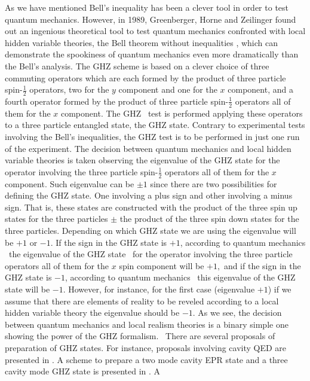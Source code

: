 \documentclass[12pt,thmsa]{article}
\begin{document}
As we have mentioned Bell's inequality has been a clever tool in order to
test quantum mechanics. However, in 1989, Greenberger, Horne and Zeilinger
found out an ingenious theoretical tool to test quantum mechanics confronted
with local hidden variable theories, the Bell theorem without inequalities 
\cite{GHZ, Mermin, RevBellsIneq}, which can demonstrate the spookiness of
quantum mechanics even more dramatically than the Bell's analysis. The GHZ
scheme is based on a clever choice of three commuting operators which are
each formed by the product of three particle spin-$\frac{1}{2}$ operators,
two for the $y$ component and one for the $x$ component, and a fourth
operator formed by the product of three particle spin-$\frac{1}{2}$
operators all of them for the $x$ component. The GHZ \ test is performed
applying these operators to a three particle entangled state, the GHZ state.
Contrary to experimental tests involving the Bell's inequalities, the GHZ
test is to be performed in just one run of the experiment. The decision
between quantum mechanics and local hidden variable theories is taken
observing the eigenvalue of the GHZ state for the operator involving the
three particle spin-$\frac{1}{2}$ operators all of them for the $x$
component. Such eigenvalue can be $\pm 1$ since there are two possibilities
for defining the GHZ state. One involving a plus sign and other involving a
minus sign. That is, these states are constructed with the product of the
three spin up states for the three particles $\pm $ the product of the three
spin down states for the three particles. Depending on which GHZ state we
are using the eigenvalue will be $+1$ or $-1$. If the sign in the GHZ state
is $+1$, according to quantum mechanics \ the eigenvalue of the GHZ state \
for the operator involving the three particle operators all of them for the $%
x$ spin component will be $+1,$ and if the sign in the GHZ state is $-1$,
according to quantum mechanics \ this eigenvalue of the GHZ state will be $%
-1 $. However, for instance, for the first case (eigenvalue $+1$) if we
assume that there are elements of reality to be reveled according to a local
hidden variable theory the eigenvalue should be $-1$. As we see, the
decision between quantum mechanics and local realism theories is a binary
simple one showing the power of the GHZ formalism. \ There are several
proposals of preparation of GHZ states. For instance, proposals involving
cavity QED are presented in \cite{GHZLambdaat, GHZWalther, Gerry,
RevHaroche, Zeng, YeGuo1}. A scheme to prepare a two mode cavity EPR state
and a three cavity mode GHZ state is presented in \cite{SongLuZhangGuo}. A
\end{document}
